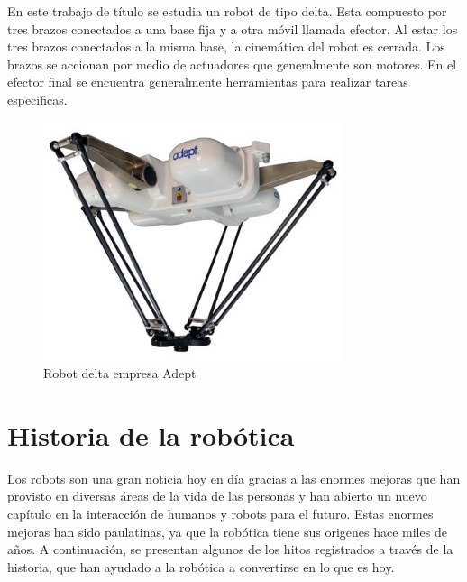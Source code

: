     En este trabajo de título se estudia un robot de tipo delta. Esta compuesto por tres brazos conectados a una base fija y a otra móvil llamada efector. Al estar los tres brazos conectados a la misma base, la cinemática del robot es cerrada. Los brazos se accionan por medio de actuadores que generalmente son motores. En el efector final se encuentra generalmente herramientas para realizar tareas especificas.
    
    \begin{figure}[htb]
        \centering
        \includegraphics[width=0.4\linewidth]{Main/Chapter2/Images2/Robot-delta-empresa-Adept.jpg}
        \caption{Robot delta empresa Adept}
        \label{f:Cap2_general_3}
    \end{figure}
    
    
\section{Historia de la robótica}
    
    Los robots son una gran noticia hoy en día gracias a las enormes mejoras que han provisto en diversas áreas de la vida de las personas y han abierto un nuevo capítulo en la interacción de humanos y robots para el futuro. Estas enormes mejoras han sido paulatinas, ya que la robótica tiene sus origenes hace miles de años. A continuación, se presentan algunos de los hitos registrados a través de la historia, que han ayudado a la robótica a convertirse en lo que es hoy.
    
